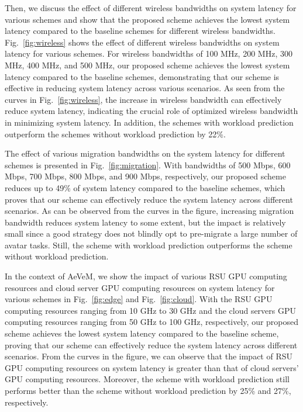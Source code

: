 \documentclass[lettersize,journal]{IEEEtran}
\begin{document}
Then, we discuss the effect of different wireless bandwidths on system latency for various schemes and show that the proposed scheme achieves the lowest system latency compared to the baseline schemes for different wireless bandwidths. Fig.~\ref{fig:wireless} shows the effect of different wireless bandwidths on system latency for various schemes. For wireless bandwidths of 100 MHz, 200 MHz, 300 MHz, 400 MHz, and 500 MHz, our proposed scheme achieves the lowest system latency compared to the baseline schemes, demonstrating that our scheme is effective in reducing system latency across various scenarios. As seen from the curves in Fig.~\ref{fig:wireless}, the increase in wireless bandwidth can effectively reduce system latency, indicating the crucial role of optimized wireless bandwidth in minimizing system latency. In addition, the schemes with workload prediction outperform the schemes without workload prediction by 22\%.

The effect of various migration bandwidths on the system latency for different schemes is presented in Fig.~\ref{fig:migration}. With bandwidths of 500 Mbps, 600 Mbps, 700 Mbps, 800 Mbps, and 900 Mbps, respectively, our proposed scheme reduces up to 49\% of system latency compared to the baseline schemes, which proves that our scheme can effectively reduce the system latency across different scenarios. As can be observed from the curves in the figure, increasing migration bandwidth reduces system latency to some extent, but the impact is relatively small since a good strategy does not blindly opt to pre-migrate a large number of avatar tasks. Still, the scheme with workload prediction outperforms the scheme without workload prediction.

In the context of AeVeM, we show the impact of various RSU GPU computing resources and cloud server GPU computing resources on system latency for various schemes in Fig.~\ref{fig:edge} and Fig.~\ref{fig:cloud}. With the RSU GPU computing resources ranging from 10 GHz to 30 GHz and the cloud servers GPU computing resources ranging from 50 GHz to 100 GHz, respectively, our proposed scheme achieves the lowest system latency compared to the baseline scheme, proving that our scheme can effectively reduce the system latency across different scenarios. From the curves in the figure, we can observe that the impact of RSU GPU computing resources on system latency is greater than that of cloud servers' GPU computing resources. Moreover, the scheme with workload prediction still performs better than the scheme without workload prediction by 25\% and 27\%, respectively.
\end{document}
